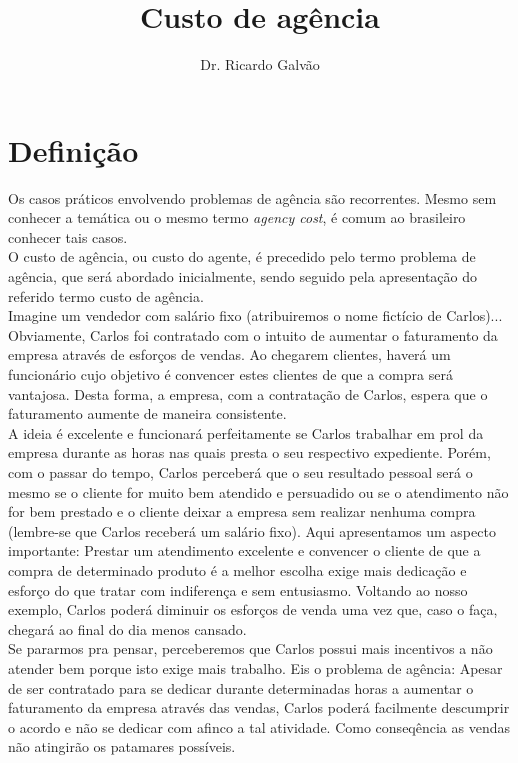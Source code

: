 \documentclass[jou,apacite]{apa6}
\title{Custo de agência}
\author{Dr. Ricardo Galvão}
\affiliation{https://github.com/rcgalvao/financas}
\begin{document}
\maketitle    
                        
\section{Definição}
Os casos práticos envolvendo problemas de agência são recorrentes. Mesmo sem conhecer a temática ou o mesmo termo \textit{agency cost}, é comum ao brasileiro conhecer tais casos. \\
O custo de agência, ou custo do agente, é precedido pelo termo problema de agência, que será abordado inicialmente, sendo seguido pela apresentação do referido termo custo de agência.\\
Imagine um vendedor com salário fixo (atribuiremos o nome fictício de Carlos)... Obviamente, Carlos foi contratado com o intuito de aumentar o faturamento da empresa através de esforços de vendas. Ao chegarem clientes, haverá um funcionário cujo objetivo é convencer estes clientes de que a compra será vantajosa. Desta forma, a empresa, com a contratação de Carlos, espera que o faturamento aumente de maneira consistente.\\
A ideia é excelente e funcionará perfeitamente se Carlos trabalhar em prol da empresa durante as horas nas quais presta o seu respectivo expediente. Porém, com o passar do tempo, Carlos perceberá que o seu resultado pessoal será o mesmo se o cliente for muito bem atendido e persuadido ou se o atendimento não for bem prestado e o cliente deixar a empresa sem realizar nenhuma compra (lembre-se que Carlos receberá um salário fixo). Aqui apresentamos um aspecto importante: Prestar um atendimento excelente e convencer o cliente de que a compra de determinado produto é a melhor escolha exige mais dedicação e esforço do que tratar com indiferença e sem entusiasmo. Voltando ao nosso exemplo, Carlos poderá diminuir os esforços de venda uma vez que, caso o faça, chegará ao final do dia menos cansado.\\
Se pararmos pra pensar, perceberemos que Carlos possui mais incentivos a não atender bem porque isto exige mais trabalho. Eis o problema de agência: Apesar de ser contratado para se dedicar durante determinadas horas a aumentar o faturamento da empresa através das vendas, Carlos poderá facilmente descumprir o acordo e não se dedicar com afinco a tal atividade. Como conseqência as vendas não atingirão os patamares possíveis.\\
\end{document}
